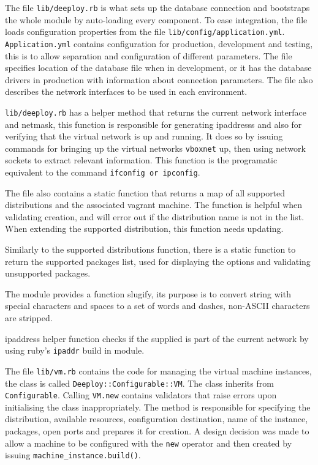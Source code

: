 \documentclass{article}
\begin{document}
The file \texttt{lib/deeploy.rb} is what sets up the database connection and bootstraps the whole module by auto-loading every component. To ease integration, the file loads configuration properties from the file \texttt{lib/config/application.yml}. \texttt{Application.yml} contains configuration for production, development and testing, this is to allow separation and configuration of different parameters. The file specifies location of the database file when in development, or it has the database drivers in production with information about connection parameters. The file also describes the network interfaces to be used in each environment.

\texttt{lib/deeploy.rb} has a helper method that returns the current network interface and \gls{netmask}, this function is responsible for generating \glspl{ipaddress} and also for verifying that the virtual network is up and running. It does so by issuing commands for bringing up the virtual networks \texttt{vboxnet} up, then using network sockets to extract relevant information. This function is the programatic equivalent to the command \texttt{ifconfig or ipconfig}.

The file also contains a static function that returns a map of all supported distributions and the associated \gls{vagrant} machine. The function is helpful when validating creation, and will error out if the \gls{distribution} name is not in the list. When extending the supported distribution, this function needs updating. 

Similarly to the supported \glspl{distribution} function, there is a static function to return the supported packages list, used for displaying the options and validating unsupported packages.

The module provides a function slugify, its purpose is to convert string with special characters and spaces to a set of words and dashes, non-ASCII characters are stripped.

\gls{ipaddress} helper function checks if the supplied  is part of the current network by using ruby's \texttt{ipaddr} build in module. 

The file \texttt{lib/vm.rb} contains the code for managing the virtual machine instances, the class is called \texttt{Deeploy::Configurable::VM}. The class inherits from \texttt{Configurable}. Calling \texttt{VM.new} contains validators that raise errors upon initialising the class inappropriately. 
The method is responsible for specifying the distribution, available resources, configuration destination, name of the instance, packages, open ports and prepares it for creation. A design decision was made to allow a machine to be configured with the \texttt{new} operator and then created by issuing \texttt{machine\_instance.build()}.
\end{document}
